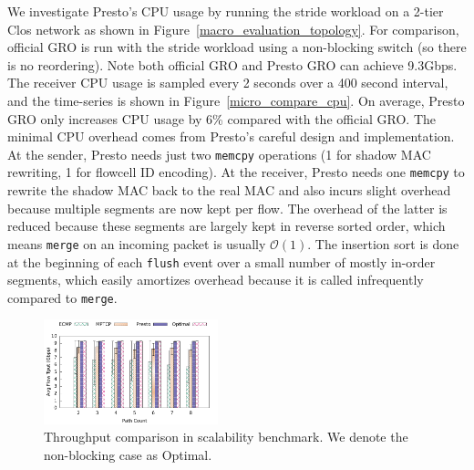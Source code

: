 We investigate Presto's CPU usage by
running the stride workload on a 2-tier Clos network as shown in Figure~\ref{macro_evaluation_topology}. 
For comparison, official GRO is run with the stride workload using a non-blocking switch (so there
is no reordering). Note both official GRO and Presto GRO can achieve 9.3Gbps.  
The receiver CPU usage is sampled every 2 seconds over a 400 second interval, and
the time-series is shown in Figure~\ref{micro_compare_cpu}. 
On average, Presto GRO only increases CPU usage by 6\% compared with the official GRO. 
The minimal CPU overhead comes from Presto's careful design and implementation. 
At the sender, Presto needs just two {\tt memcpy} operations (1 for shadow MAC rewriting, 1 for flowcell ID encoding). 
At the receiver, Presto needs one {\tt memcpy} to rewrite the shadow MAC back to the real MAC and
also incurs slight overhead because multiple segments are now kept per flow. The overhead
of the latter is reduced because these segments are largely kept in reverse sorted order, which means {\tt merge}
on an incoming packet is usually $\mathcal{O}(1)$. The insertion sort is done at the beginning of each {\tt flush} event over a small
number of mostly in-order segments, which easily amortizes overhead because it is called infrequently compared to {\tt merge}.

\begin{figure}[t]
        \centering
  \includegraphics[width=0.45\textwidth]{presto/figures/scalability_test/scalability_compare_tput_witherrbar.pdf}
        \caption{Throughput comparison in scalability benchmark. We denote the non-blocking case as Optimal. 
		} 
        \label{micro_scalability_test_tput}
\end{figure}

